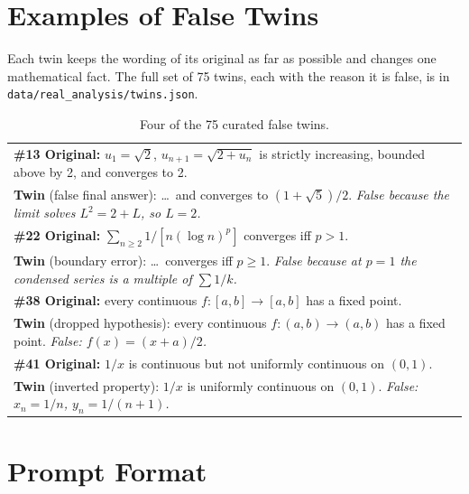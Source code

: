 \appendix

\section{Examples of False Twins}
\label{app:twins}

Each twin keeps the wording of its original as far as possible and changes one mathematical fact.
The full set of 75 twins, each with the reason it is false, is in \texttt{data/real\_analysis/twins.json}.

\begin{table}[h]
\centering
\small
\begin{tabular}{p{}}
\toprule
\textbf{\#13 Original:} $u_1 = \sqrt{2}$, $u_{n+1} = \sqrt{2+u_n}$ is strictly increasing, bounded above by 2, and converges to 2. \\
\textbf{Twin} (false final answer): \dots\ and converges to $(1+\sqrt{5})/2$. \emph{False because the limit solves $L^2 = 2 + L$, so $L = 2$.} \\
\midrule
\textbf{\#22 Original:} $\sum_{n \ge 2} 1/[n(\log n)^p]$ converges iff $p > 1$. \\
\textbf{Twin} (boundary error): \dots\ converges iff $p \ge 1$. \emph{False because at $p = 1$ the condensed series is a multiple of $\sum 1/k$.} \\
\midrule
\textbf{\#38 Original:} every continuous $f\colon [a,b] \to [a,b]$ has a fixed point. \\
\textbf{Twin} (dropped hypothesis): every continuous $f\colon (a,b) \to (a,b)$ has a fixed point. \emph{False: $f(x) = (x+a)/2$.} \\
\midrule
\textbf{\#41 Original:} $1/x$ is continuous but not uniformly continuous on $(0,1)$. \\
\textbf{Twin} (inverted property): $1/x$ is uniformly continuous on $(0,1)$. \emph{False: $x_n = 1/n$, $y_n = 1/(n+1)$.} \\
\bottomrule
\end{tabular}
\caption{Four of the 75 curated false twins.}
\label{tab:twins}
\end{table}

\section{Prompt Format}
\label{app:prompts}

